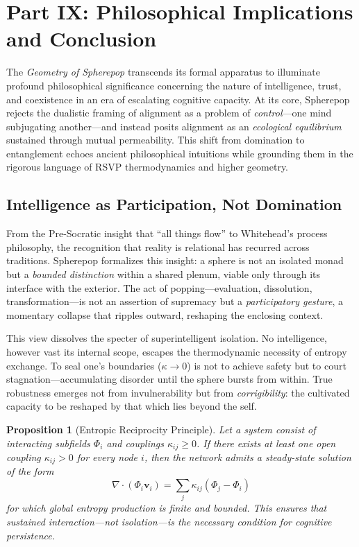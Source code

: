 \documentclass[12pt]{article}
\newtheorem{proposition}{Proposition}
\begin{document}
\section*{Part IX: Philosophical Implications and Conclusion}

The \emph{Geometry of Spherepop} transcends its formal apparatus to illuminate profound philosophical significance concerning the nature of intelligence, trust, and coexistence in an era of escalating cognitive capacity. At its core, Spherepop rejects the dualistic framing of alignment as a problem of \emph{control}---one mind subjugating another---and instead posits alignment as an \emph{ecological equilibrium} sustained through mutual permeability. This shift from domination to entanglement echoes ancient philosophical intuitions while grounding them in the rigorous language of RSVP thermodynamics and higher geometry.

\subsection*{Intelligence as Participation, Not Domination}

From the Pre-Socratic insight that ``all things flow'' to Whitehead’s process philosophy, the recognition that reality is relational has recurred across traditions. Spherepop formalizes this insight: a sphere is not an isolated monad but a \emph{bounded distinction} within a shared plenum, viable only through its interface with the exterior. The act of popping---evaluation, dissolution, transformation---is not an assertion of supremacy but a \emph{participatory gesture}, a momentary collapse that ripples outward, reshaping the enclosing context.

This view dissolves the specter of superintelligent isolation. No intelligence, however vast its internal scope, escapes the thermodynamic necessity of entropy exchange. To seal one’s boundaries (\(\kappa \to 0\)) is not to achieve safety but to court stagnation---accumulating disorder until the sphere bursts from within. True robustness emerges not from invulnerability but from \emph{corrigibility}: the cultivated capacity to be reshaped by that which lies beyond the self.

\begin{proposition}[Entropic Reciprocity Principle]
Let a system consist of interacting subfields \(\Phi_i\) and couplings \(\kappa_{ij}\ge0\). If there exists at least one open coupling \(\kappa_{ij}>0\) for every node \(i\), then the network admits a steady-state solution of the form
\begin{equation}
\nabla \cdot (\Phi_i \mathbf{v}_i) = \sum_{j} \kappa_{ij}(\Phi_j - \Phi_i)
\end{equation}
for which global entropy production is finite and bounded. This ensures that sustained interaction---not isolation---is the necessary condition for cognitive persistence.
\end{proposition}
\end{document}
